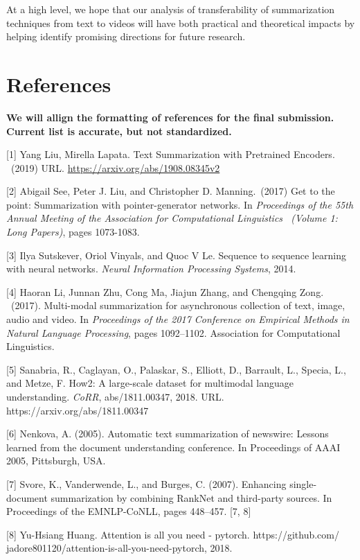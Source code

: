 \documentclass{article}
\begin{document}
At a high level, we hope that our analysis of transferability of summarization techniques from text to videos will have both practical and theoretical impacts by helping identify promising directions for future research.


\section*{References} 

{\bf We will allign the formatting of references for the final submission. Current list is accurate, but not standardized.}
\medskip



[1] Yang Liu, Mirella Lapata. Text Summarization with Pretrained Encoders.  \ (2019) URL. \url{https://arxiv.org/abs/1908.08345v2}

[2] Abigail See, Peter J. Liu, and Christopher D. Manning.\ (2017) Get to the point: Summarization with pointer-generator networks. In {\it Proceedings of the 55th Annual Meeting of the Association for Computational Linguistics \ (Volume 1: Long Papers)}, pages 1073-1083.

[3] Ilya Sutskever, Oriol Vinyals, and Quoc V Le. Sequence to sequence learning with neural networks.
 {\it Neural Information Processing Systems}, 2014. 

[4] Haoran Li, Junnan Zhu, Cong Ma, Jiajun Zhang, and Chengqing Zong. \ (2017). Multi-modal summarization for
asynchronous collection of text, image, audio and video. In {\it Proceedings of the 2017 Conference on Empirical
Methods in Natural Language Processing}, pages 1092–1102. Association for Computational Linguistics.

[5] Sanabria, R., Caglayan, O., Palaskar, S., Elliott, D., Barrault, L., Specia, L., and Metze, F. How2: A large-scale dataset for multimodal language understanding. {\it CoRR}, abs/1811.00347, 2018. URL. https://arxiv.org/abs/1811.00347

[6] Nenkova, A. (2005). Automatic text summarization of newswire: Lessons learned from the document understanding conference. In Proceedings of AAAI 2005, Pittsburgh, USA.

[7] Svore, K., Vanderwende, L., and Burges, C. (2007). Enhancing single-document summarization by combining RankNet and third-party sources. In Proceedings of the EMNLP-CoNLL, pages 448–457. [7, 8] 

[8] Yu-Hsiang Huang. Attention is all you need - pytorch. https://github.com/ jadore801120/attention-is-all-you-need-pytorch, 2018.
\end{document}
